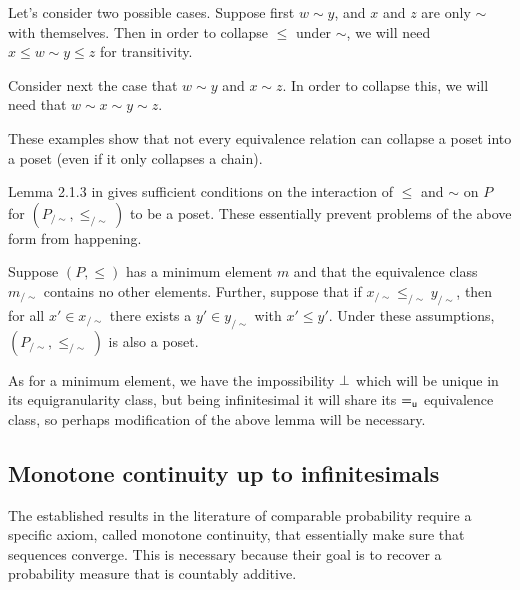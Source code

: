 \documentclass[10pt, onecolumn, longbibliography, nofootinbib]{revtex4-2}
\begin{document}

Let's consider two possible cases. Suppose first $w\sim y$, and $x$ and $z$ are only $\sim$ with themselves. Then in order to collapse $\leq$ under $\sim$, we will need $x \leq w\sim y \leq z$ for transitivity. 

Consider next the case that $w\sim y$ and $x\sim z$. In order to collapse this, we will need that $w\sim x\sim y \sim z$.

These examples show that not every equivalence relation can collapse a poset into a poset (even if it only collapses a chain). 

Lemma 2.1.3 in \cite{quotientposets} gives sufficient conditions on the interaction of $\leq$ and $\sim$ on $P$ for $(P_{/\sim},\leq_{/\sim})$ to be a poset. These essentially prevent problems of the above form from happening. 

\begin{prop}
Suppose $(P,\leq)$ has a minimum element $m$ and that the equivalence class $m_{/\sim}$ contains no other elements. Further, suppose that if $x_{/\sim} \leq_{/\sim} y_{/\sim}$, then for all $x'\in x_{/\sim}$ there exists a $y'\in y_{/\sim}$ with $x'\leq y'$. 
Under these assumptions, $(P_{/\sim},\leq_{/\sim})$ is also a poset.
\end{prop}

As for a minimum element, we have the impossibility $\bot$ which will be unique in its equigranularity class, but being infinitesimal it will share its $=_{\mathsf{u}}$ equivalence class, so perhaps modification of the above lemma will be necessary. 

\subsection{Monotone continuity up to infinitesimals}

The established results in the literature of comparable probability require a specific axiom, called monotone continuity, that essentially make sure that sequences converge. This is necessary because their goal is to recover a probability measure that is countably additive.
\end{document}
